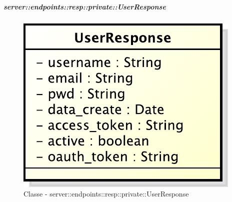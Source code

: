     \subparagraph{server::endpoints::resp::private::UserResponse} %
    \label{subp:bdsm_app_server_endpoints_resp_private_userresponse}
  \begin{figure}[!htbp]
    \centering
    \centerline{\includegraphics[scale=0.6]{./images/server/classes/endpoints/user_response.pdf}}
    \caption{Classe - server::endpoints::resp::private::UserResponse}
  \end{figure}
